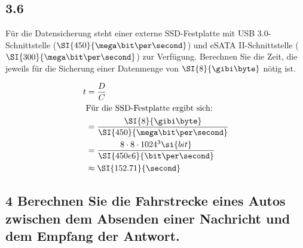     
    \subsection*{3.6}

    Für die Datensicherung steht einer externe SSD-Festplatte mit USB 3.0-Schnittstelle ($\SI{450}{\mega\bit\per\second}$)
    und eSATA II-Schnittstelle ($\SI{300}{\mega\bit\per\second}$) zur Verfügung. Berechnen Sie die Zeit, die jeweils für
    die Sicherung einer Datenmenge von $\SI{8}{\gibi\byte}$ nötig ist.

    \begin{align}
      t &= \frac{D}{C}\\
      \intertext{
        Für die SSD-Festplatte ergibt sich:
      }
        &= \frac{\SI{8}{\gibi\byte}}{\SI{450}{\mega\bit\per\second}}\\
        &= \frac{8 \cdot 8 \cdot 1024^{3} \si{bit} }{\SI{450e6}{\bit\per\second}}\\
        &\approx \SI{152.71}{\second}\\
    \end{align}

    \subsection*{4 Berechnen Sie die Fahrstrecke eines Autos zwischen dem Absenden einer Nachricht und dem Empfang der Antwort.}
    
    



